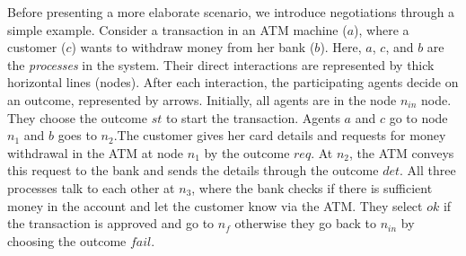 Before presenting a more elaborate scenario, we introduce negotiations through a simple example. Consider a transaction in an ATM machine ($a$), where a customer ($c$) wants to withdraw money from her bank ($b$).  Here, $a$, $c$, and $b$ are the \emph{processes} in the system. Their direct interactions are represented by thick horizontal lines (nodes). After each interaction, the participating agents decide on an outcome, represented by arrows. Initially, all agents are in the node $n_{in}$ node. They choose the outcome $st$ to start the transaction. Agents $a$ and $c$ go to node $n_1$ and $b$ goes to $n_2$.The customer gives her card details and requests for money withdrawal in the ATM at node $n_1$ by the outcome $req$. At $n_2$, the ATM conveys this request to the bank and sends the details through the outcome $det$. All three processes talk to each other at $n_3$, where the bank checks if there is sufficient money in the account and let the customer know via the ATM. They select $ok$ if the transaction is approved and go to $n_f$ otherwise they go back to $n_{in}$ by choosing the outcome $fail$.

